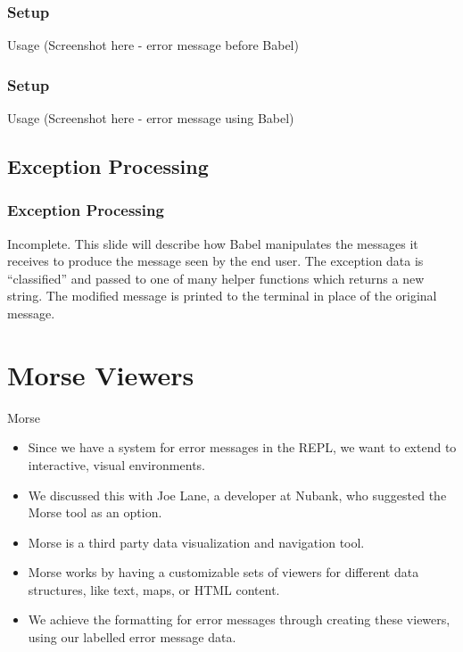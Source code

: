 \documentclass{beamer}
\begin{document}
\begin{frame}
    \frametitle{Setup}
    Usage
    (Screenshot here - error message before Babel)
\end{frame}

\begin{frame}
    \frametitle{Setup}
    Usage
    (Screenshot here - error message using Babel)
\end{frame}

\subsection{Exception Processing}

\begin{frame}
\frametitle{Exception Processing}
Incomplete. This slide will describe how Babel manipulates the messages it receives to produce the message seen by the end user. The exception data is ``classified'' and passed to one of many helper functions which returns a new string. The modified message is printed to the terminal in place of the original message.
\end{frame}

\section{Morse Viewers}

\begin{frame}{Morse}
  \begin{itemize}
    \item<1-> Since we have a system for error messages in the REPL, we want to extend to interactive, visual environments.
    \item<2-> We discussed this with Joe Lane, a developer at Nubank, who suggested the Morse tool as an option.
    \item<3-> Morse is a third party data visualization and navigation tool.
    \item<4-> Morse works by having a customizable sets of viewers for different data structures, like text, maps, or HTML content.
    \item<5-> We achieve the formatting for error messages through creating these viewers, using our labelled error message data.
  \end{itemize}
\end{frame}

\begin{frame}

\end{frame}
\end{document}
